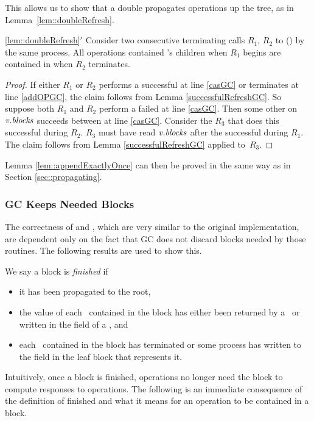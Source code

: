 This allows us to show that a double  propagates operations up the tree, 
as in Lemma~\ref{lem::doubleRefresh}.

\begin{customlemma}{\ref{lem::doubleRefresh}$'$}\label{lem::doubleRefreshGC}
Consider two consecutive terminating calls $R_1$, $R_2$ to () by the same process.
All operations contained 's children when $R_1$ begins
are contained in  when $R_2$ terminates.
\end{customlemma}
\begin{proof}
If either $R_1$ or $R_2$ performs a successful  at line \ref{casGC} or terminates at line \ref{addOPGC}, the claim follows
from Lemma \ref{successfulRefreshGC}.
So suppose both $R_1$ and $R_2$ perform a failed  at line \ref{casGC}.
Then some other  on $\mbox{\textnormal{\textit{v}}}.\mbox{\textit{blocks}}$ succeeds between  at line \ref{casGC}.
Consider the  $R_3$ that does this successful  during $R_2$.
$R_3$ must have read $\mbox{\textnormal{\textit{v}}}.\mbox{\textit{blocks}}$ after the successful  during $R_1$.
The claim follows from Lemma \ref{successfulRefreshGC} applied to~$R_3$.
\end{proof}

Lemma \ref{lem::appendExactlyOnce} can then be proved in the same way as in Section \ref{sec::propagating}.


\subsubsection{GC Keeps Needed Blocks}

The correctness of  and , which are very similar to the 
original implementation, are dependent only on the fact that GC does not 
discard blocks needed by those routines.
The following results are used to show this.

We say a block is \emph{finished} if 
\begin{itemize}
\item
it has been propagated to the root,
\item
the value of each \enqueue\ contained in the block has either been returned by a \dequeue\ or 
written in the  field of a \dequeue, and
\item
each \dequeue\ contained in the block has terminated or some process has written to the  field in the leaf block that represents it.
\end{itemize}
Intuitively, once a block is finished, operations no longer need  the block
to compute responses to operations.
The following is an immediate consequence of the definition of finished and what it means for an operation to be contained in a block.

